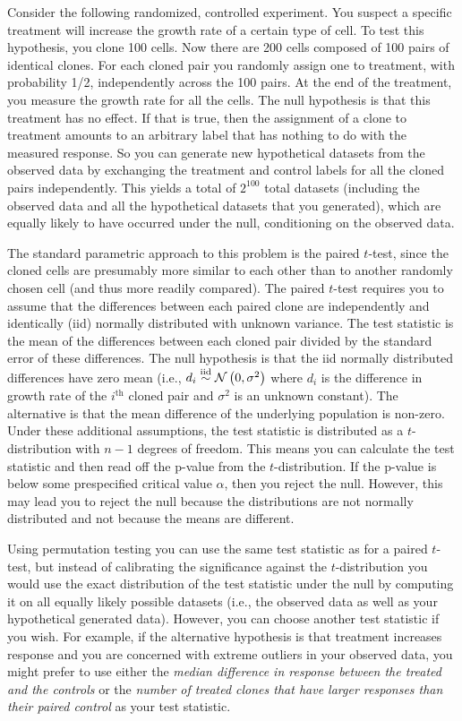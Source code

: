 \begin{example}[label=exa:cont] Consider the following randomized, controlled
experiment.  You suspect a specific treatment will increase the growth rate of
a certain type of cell.  To test this hypothesis, you clone 100 cells. Now
there are 200 cells composed of 100 pairs of identical clones. For each cloned
pair you randomly assign one to treatment, with probability 1/2, independently
across the 100 pairs.  At the end of the treatment, you measure the growth rate
for all the cells.  The null hypothesis is that this treatment has no effect.
If that is true, then the assignment of a clone to treatment amounts to an
arbitrary label that has nothing to do with the measured response.  So you can
generate new hypothetical datasets from the observed data by exchanging the
treatment and control labels for all the cloned pairs independently.  This
yields a total of $2^{100}$ total datasets (including the observed data and all
the hypothetical datasets that you generated), which are equally likely to have
occurred under the null, conditioning on the observed data.

The standard parametric approach to this problem is the paired $t$-test, since
the cloned cells are presumably more similar to each other than to another
randomly chosen cell (and thus more readily compared).  The paired $t$-test
requires you to assume that the differences between each paired clone are
independently and identically (iid) normally distributed with unknown variance.
The test statistic is the mean of the differences between each cloned pair
divided by the standard error of these differences.  The null hypothesis is
that the iid normally distributed differences have zero mean (i.e., $d_i \stackrel{\mathrm{iid}}{\sim}
\mathcal{N}\left(0,\sigma^2\right)$ where $d_i$ is the difference in growth rate of the
$i^{\text{th}}$ cloned pair and $\sigma^2$ is an unknown constant).  The
alternative is that the mean difference of the underlying population is
non-zero.  Under these additional assumptions, the test statistic is
distributed as a $t$-distribution with $n-1$ degrees of freedom.  This means you can
calculate the test statistic and then read off the p-value from the
$t$-distribution.  If the p-value is below some prespecified critical value
$\alpha$, then you reject the null.  However, this may lead you to reject the
null because the distributions are not normally distributed and not because the
means are different.

Using permutation testing you can use the same test statistic as for
a paired $t$-test, but instead of calibrating the significance against the
$t$-distribution you would use the exact distribution of the test statistic
under the null by computing it on all equally likely possible datasets (i.e.,
the observed data as well as your hypothetical generated data).  However, you
can choose another test statistic if you wish.  For example, if the alternative
hypothesis is that treatment increases response and you are concerned with
extreme outliers in your observed data, you might prefer to use either the
\emph{median difference in response between the treated and the controls} or
the \emph{number of treated clones that have larger responses than their
paired control} as your test statistic.


\end{example}
